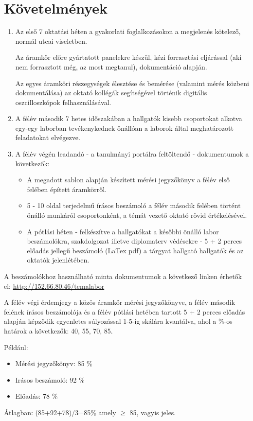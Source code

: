 \section{Követelmények}

\begin{enumerate}
\item
Az első 7 oktatási héten a gyakorlati foglalkozásokon a megjelenés kötelező, normál utcai viseletben.

Az áramkör előre gyártatott panelekre készül, kézi forrasztási eljárással (aki nem forrasztott még, az most megtanul), dokumentáció alapján.

Az egyes áramköri részegységek élesztése és bemérése (valamint mérés közbeni dokumentálása) az oktató kollégák segítségével történik digitális oszcilloszkópok felhasználásával.
\item
A félév második 7 hetes időszakában a hallgatók kisebb csoportokat alkotva egy-egy laborban tevékenykednek önállóan a laborok által meghatározott feladatokat elvégezve.

\item
A félév végén leadandó - a tanulmányi portálra feltöltendő - dokumentumok a következők:

\begin{itemize}
\item
A megadott sablon alapján készített mérési jegyzőkönyv a félév első felében épített áramkörről.
\item
5 - 10 oldal terjedelmű írásos beszámoló a félév második felében történt önálló munkáról csoportonként, a témát vezető oktató rövid értékelésével.
\item
A pótlási héten - felkészítve a hallgatókat a későbbi önálló labor beszámolókra, szakdolgozat illetve diplomaterv védésekre - 5 + 2 perces előadás jellegű beszámoló (LaTex pdf) a tárgyat hallgató hallgatók és az oktatók jelenlétében.
\end{itemize}

\end{enumerate}

A beszámolókhoz használható minta dokumentumok a következő linken érhetők el: \url{http://152.66.80.46/temalabor}

A félév végi érdemjegy a közös áramkör mérési jegyzőkönyve, a félév második felének írásos beszámolója és a félév pótlási hetében tartott 5 + 2 perces előadás alapján képződik egyenletes súlyozással 1-5-ig skálára kvantálva, ahol a \%-os határok a következők: 40, 55, 70, 85.

Például:
\begin{itemize}
\item
Mérési jegyzőkönyv: 85 \%
\item
Irásos beszámoló: 92 \%
\item
Előadás: 78 \%
\end{itemize}

Átlagban: (85+92+78)/3=85\% amely $\geq$ 85, vagyis jeles.


